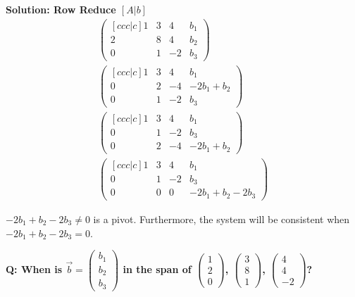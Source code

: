 \noindent
\textbf{Solution: Row Reduce \([A | b]\)}
\begin{align}
    \begin{pmatrix}[ccc|c]
        1 & 3 & 4 & b_1 \\
        2 & 8 & 4 & b_2 \\
        0 & 1 & -2 & b_3
    \end{pmatrix} \\
    \begin{pmatrix}[ccc|c]
        1 & 3 & 4 & b_1 \\
        0 & 2 & -4 & -2b_1 + b_2 \\
        0 & 1 & -2 & b_3
    \end{pmatrix} \\
    \begin{pmatrix}[ccc|c]
        1 & 3 & 4 & b_1 \\
        0 & 1 & -2 & b_3 \\
        0 & 2 & -4 & -2b_1 + b_2
    \end{pmatrix} \\
    \begin{pmatrix}[ccc|c]
        1 & 3 & 4 & b_1 \\
        0 & 1 & -2 & b_3 \\
        0 & 0 & 0 & -2b_1 + b_2 - 2b_3
    \end{pmatrix}
\end{align}

\noindent
\(-2b_1 + b_2 - 2b_3 \neq 0\) is a pivot. Furthermore, the system will be consistent when \(-2b_1 + b_2 - 2b_3 = 0\).

\noindent
\newline
\textbf{Q: When is \(\Vec{b} = \begin{pmatrix}
    b_1 \\ b_2 \\ b_3
\end{pmatrix}\) in the span of \(\begin{pmatrix}
    1 \\ 2 \\ 0
\end{pmatrix}\), \(\begin{pmatrix}
    3 \\ 8 \\ 1
\end{pmatrix}\), \(\begin{pmatrix}
    4 \\ 4 \\ -2
\end{pmatrix}\)?}


